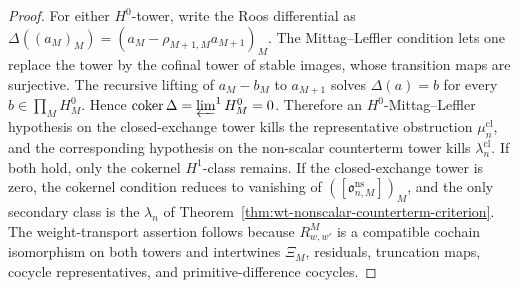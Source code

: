 \begin{proof}
  For either \(H^0\)-tower, write the Roos differential as
  \(\Delta((a_M)_M)=(a_M-\rho_{M+1,M}a_{M+1})_M\).  The
  Mittag--Leffler condition lets one replace the tower by the cofinal
  tower of stable images, whose transition maps are surjective.  The
  recursive lifting of \(a_M-b_M\) to \(a_{M+1}\) solves
  \(\Delta(a)=b\) for every \(b\in\prod_MH^0_M\).  Hence
  \(\operatorname{coker}\Delta=\varprojlim^1H^0_M=0\).  Therefore an
  \(H^0\)-Mittag--Leffler hypothesis on the closed-exchange tower kills
  the representative obstruction \(\mu^{\mathrm{cl}}_n\), and the
  corresponding hypothesis on the non-scalar counterterm tower kills
  \(\lambda^{\mathrm{cl}}_n\).  If both hold, only the cokernel
  \(H^1\)-class remains.  If the closed-exchange tower is zero, the
  cokernel condition reduces to vanishing of
  \(([\mathfrak o^{\mathrm{ns}}_{n,M}])_M\), and the only secondary class
  is the \(\lambda_n\) of
  Theorem~\ref{thm:wt-nonscalar-counterterm-criterion}.
  The weight-transport assertion follows because \(R^M_{w,w'}\) is a
  compatible cochain isomorphism on both towers and intertwines
  \(\Xi_M\), residuals, truncation maps, cocycle representatives, and
  primitive-difference cocycles.
\end{proof}

